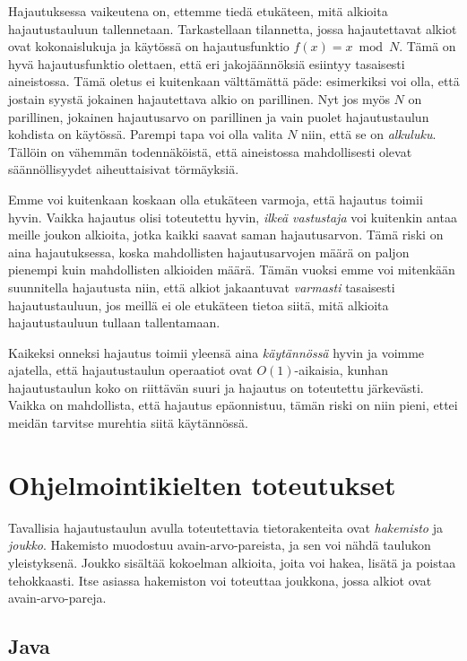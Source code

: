Hajautuksessa vaikeutena on, ettemme tiedä etukäteen,
mitä alkioita hajautustauluun tallennetaan.
Tarkastellaan tilannetta,
jossa hajautettavat alkiot ovat kokonaislukuja
ja käytössä on hajautusfunktio $f(x) = x \bmod N$.
Tämä on hyvä hajautusfunktio olettaen,
että eri jakojäännöksiä esiintyy tasaisesti aineistossa.
Tämä oletus ei kuitenkaan välttämättä päde:
esimerkiksi voi olla, että jostain syystä
jokainen hajautettava alkio on parillinen.
Nyt jos myös $N$ on parillinen, jokainen hajautusarvo
on parillinen ja vain puolet hajautustaulun kohdista on käytössä.
Parempi tapa voi olla valita $N$ niin, että se on \emph{alkuluku}.
Tällöin on vähemmän todennäköistä,
että aineistossa mahdollisesti olevat säännöllisyydet
aiheuttaisivat törmäyksiä.

Emme voi kuitenkaan koskaan olla etukäteen varmoja,
että hajautus toimii hyvin.
Vaikka hajautus olisi toteutettu hyvin,
\emph{ilkeä vastustaja} voi kuitenkin antaa
meille joukon alkioita, jotka kaikki saavat saman hajautusarvon.
Tämä riski on aina hajautuksessa, koska mahdollisten
hajautusarvojen määrä on paljon pienempi kuin mahdollisten alkioiden määrä.
Tämän vuoksi emme voi mitenkään suunnitella hajautusta niin,
että alkiot jakaantuvat \emph{varmasti} tasaisesti hajautustauluun,
jos meillä ei ole etukäteen tietoa siitä,
mitä alkioita hajautustauluun tullaan tallentamaan.

Kaikeksi onneksi hajautus toimii yleensä aina \emph{käytännössä}
hyvin ja voimme ajatella, että hajautustaulun operaatiot ovat
$O(1)$-aikaisia, kunhan hajautustaulun koko on riittävän suuri ja
hajautus on toteutettu järke\-västi.
Vaikka on mahdollista, että hajautus epäonnistuu,
tämän riski on niin pieni, ettei meidän tarvitse murehtia
siitä käytännössä.

\section{Ohjelmointikielten toteutukset}

Tavallisia hajautustaulun avulla toteutettavia tietorakenteita
ovat \emph{hakemisto} ja \emph{joukko}.
Hakemisto muodostuu avain-arvo-pareista,
ja sen voi nähdä taulukon yleistyksenä.
Joukko sisältää kokoelman alkioita, joita voi hakea,
lisätä ja poistaa tehokkaasti.
Itse asiassa hakemiston voi toteuttaa joukkona, jossa alkiot ovat 
avain-arvo-pareja.

\subsection{Java}

